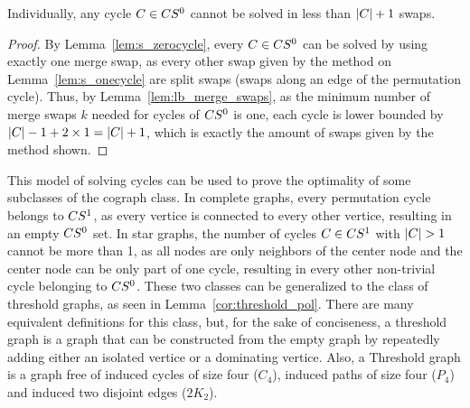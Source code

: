 \documentclass[msc,english,table,xcdraw]{ppgccufmg}
\begin{document}
\begin{lemma}
\label{lem:m_zerocycle}
Individually, any cycle $C \in CS^{0}$ cannot be solved in less
than $|C| + 1$ swaps.
\end{lemma}


\begin{proof}
By Lemma~\ref{lem:s_zerocycle}, every $C \in CS^{0}$ can be solved
by using exactly one merge swap, as every other swap given by the method
on Lemma~\ref{lem:s_onecycle} are split swaps (swaps along an edge of the
permutation cycle).
Thus, by Lemma~\ref{lem:lb_merge_swaps}, as the minimum number of merge 
swaps $k$ needed for cycles of $CS^{0}$ is one, each cycle 
is lower bounded by $|C| - 1 + 2\times1 = |C| + 1$, 
which is exactly the amount of swaps given by the method shown. 
\end{proof}

This model of solving cycles can be used to prove the optimality of some
subclasses of the cograph class.
In complete graphs, every permutation cycle belongs to $CS^{1}$, as
every vertice is connected to every other vertice, resulting in an empty
$CS^{0}$ set.
In star graphs, the number of cycles $C \in CS^{1}$ with 
$|C| > 1$ cannot be more than 1, as all nodes are only 
neighbors of the center node and the center node can be only part 
of one cycle, resulting in every other non-trivial cycle belonging to 
$CS^{0}$.
These two classes can be generalized to the class of threshold graphs, 
as seen in Lemma~\ref{cor:threshold_pol}.
There are many equivalent definitions for this class, but, for the sake
of conciseness, a threshold graph is a graph that can be constructed from
the empty graph by repeatedly adding either an isolated vertice or a
dominating vertice.
Also, a Threshold graph is a graph free of induced cycles of size four 
($C_{4}$), induced paths of size four ($P_{4}$) and induced two disjoint 
edges ($2K_{2}$).
\end{document}
